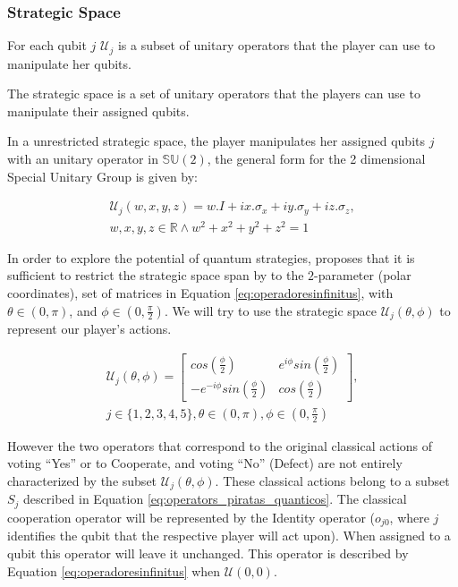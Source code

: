 \documentclass[10pt,twocolumn]{llncs}
\begin{document}
\subsubsection{Strategic Space}
\label{subsec:strategic_space}

For each qubit $j$ $\mathcal{U}_{j}$ is a subset of unitary operators that the player can use to manipulate her qubits. 


The strategic space is a set of unitary operators that the players can use to manipulate their assigned qubits.


In a unrestricted strategic space, the player manipulates her assigned qubits $j$ with an unitary operator in $\mathbb{SU}(2)$, the general form for the 2 dimensional Special Unitary Group is given by:

\begin{equation} 
\begin{split}
\mathcal{U}_{j}(w,x,y,z)=w.I + ix.\sigma_{x} + iy.\sigma_{y} + iz.\sigma_{z} , \\   w,x,y,z \in \mathbb{R} \wedge  
w^2 + x^2 + y^2 + z^2 =1 
\end{split}
\end{equation}

In  order to explore the potential of quantum strategies, \cite{Eisert2008} proposes that it is sufficient to restrict the strategic space span by to the $2$-parameter (polar coordinates), set of matrices in Equation \eqref{eq:operadoresinfinitus}, with $ \theta \in ( 0, \pi )$, and $\phi \in ( 0, \frac{\pi}{2})$. We will try to use the strategic space $\mathcal{U}_{j}(\theta,\phi)$ to represent our player's actions.



\begin{equation}
\begin{split}
\mathcal{U}_{j}(\theta,\phi) = \left[\begin{array}{cc}
cos(\frac{\phi}{2}) & e^{i\phi}sin(\frac{\phi}{2})\\
-e^{-i\phi}sin(\frac{\phi}{2}) & cos(\frac{\phi}{2})
\end{array}\right] , \\  j \in \{ 1, 2, 3, 4, 5 \}, \theta \in ( 0, \pi ) , \phi \in ( 0, \frac{\pi}{2})
\end{split}
\label{eq:operadoresinfinitus}
\end{equation}


 However the two operators that correspond to the original classical actions of voting ``Yes'' or to Cooperate, and voting ``No'' (Defect) are not entirely characterized by the subset $\mathcal{U}_{j}(\theta, \phi)$. These classical actions belong to a subset $S_{j}$ described in Equation \eqref{eq:operators_piratas_quanticos}.  
The classical cooperation operator will be represented by the Identity operator ($o_{j0}$, where $j$ identifies the qubit that the respective player will act upon). When assigned to a qubit this operator will leave it unchanged. This operator is described by Equation \eqref{eq:operadoresinfinitus} when $\mathcal{U}(0,0)$.
\end{document}

